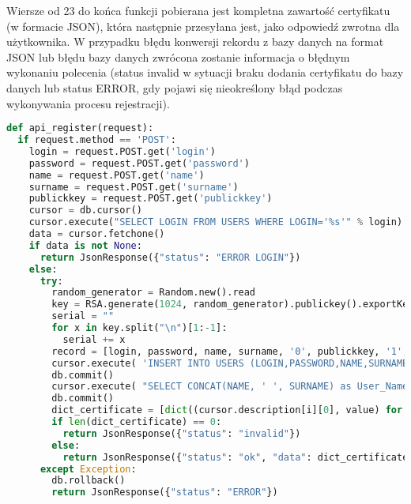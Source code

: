 Wiersze od 23 do końca funkcji pobierana jest kompletna zawartość certyfikatu (w formacie JSON), która następnie przesyłana jest, jako odpowiedź zwrotna dla użytkownika. W przypadku błędu konwersji rekordu z bazy danych na format JSON lub błędu bazy danych zwrócona zostanie informacja o błędnym wykonaniu polecenia (status invalid w sytuacji braku dodania certyfikatu do bazy danych lub status ERROR, gdy pojawi się nieokreślony błąd podczas wykonywania procesu rejestracji).

{\footnotesize
\begin{lstlisting}[caption={API rejestracji}, label={lst:serwer register}, language=Python]	
def api_register(request):
  if request.method == 'POST':
    login = request.POST.get('login')
    password = request.POST.get('password')
    name = request.POST.get('name')
    surname = request.POST.get('surname')
    publickkey = request.POST.get('publickkey')
    cursor = db.cursor()
    cursor.execute("SELECT LOGIN FROM USERS WHERE LOGIN='%s'" % login)
    data = cursor.fetchone()
    if data is not None:
      return JsonResponse({"status": "ERROR LOGIN"})
    else:
      try:
        random_generator = Random.new().read
        key = RSA.generate(1024, random_generator).publickey().exportKey()
        serial = ""
        for x in key.split("\n")[1:-1]:
          serial += x
        record = [login, password, name, surname, '0', publickkey, '1', serial, datetime.now().replace(year=datetime.now().year + 1)]
        cursor.execute( 'INSERT INTO USERS (LOGIN,PASSWORD,NAME,SURNAME,IS_ADMIN,PUBLIC_KEY, ISACTIVATED, Serial_number, Validitiy_period) VALUES(%s,%s,%s,%s,%s,%s,%s,%s,%s)', record)
        db.commit()
        cursor.execute( "SELECT CONCAT(NAME, ' ', SURNAME) as User_Name, LOGIN as Issuer_name,  PUBLIC_KEY, Serial_number, Validitiy_period, Version, Signature_Algorithm_Identifier, Hash_Algorithm FROM `users` WHERE `LOGIN` = '%s'" % (login))
        db.commit()
        dict_certificate = [dict((cursor.description[i][0], value) for i, value in enumerate(row)) for row in cursor.fetchall()]
        if len(dict_certificate) == 0:
          return JsonResponse({"status": "invalid"})
        else:
          return JsonResponse({"status": "ok", "data": dict_certificate})
      except Exception:
        db.rollback()
        return JsonResponse({"status": "ERROR"})
\end{lstlisting}}
\newpage
